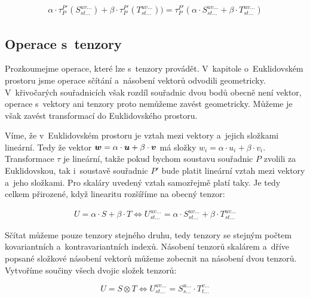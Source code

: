 \begin{equation}
\label{eq:linearni_transformace_tenzoru}
\begin{split}
\alpha \cdot \tau_{P}^{P'}(S_{st...}^{uv...}) + \beta \cdot \tau_{P}^{P'}(T_{st...}^{uv...})) = \tau_{P}^{P'}(\alpha \cdot S_{st...}^{uv...} + \beta \cdot T_{st...}^{uv...})
\end{split}
\end{equation}

\subsection{Operace s~tenzory}

Prozkoumejme operace, které lze s~tenzory provádět. V~kapitole o~Euklidovském prostoru jsme operace sčítání a~násobení vektorů odvodili geometricky. V~křivočarých souřadnicích však rozdíl souřadnic dvou bodů obecně není vektor, operace s~vektory ani tenzory proto nemůžeme zavést geometricky. Můžeme je však zavést transformací do Euklidovského prostoru.

Víme, že v~Euklidovském prostoru je vztah mezi vektory a~jejich složkami lineární. Tedy že vektor \(\boldsymbol{w} = \alpha \cdot \boldsymbol{u} + \beta \cdot \boldsymbol{v}\) má složky \(w_i = \alpha \cdot u_i + \beta \cdot v_i\). Transformace \(\tau\) je lineární, takže pokud bychom soustavu souřadnic \(P\) zvolili za Euklidovskou, tak i~soustavě souřadnic \(P'\) bude platit lineární vztah mezi vektory a~jeho složkami. Pro skaláry uvedený vztah samozřejmě platí taky. Je tedy celkem přirozené, když linearitu rozšíříme na obecný tenzor:

\begin{equation}
\label{eq:scitani_a_nasobeni_tenzoru}
\begin{split}
U = \alpha \cdot S + \beta \cdot T \Leftrightarrow U_{st...}^{uv...} = \alpha \cdot S_{st...}^{uv...} + \beta \cdot T_{st...}^{uv...}
\end{split}
\end{equation}

Sčítat můžeme pouze tenzory stejného druhu, tedy tenzory se stejným počtem kovariantních a~kontravariantních indexů. Násobení tenzorů skalárem a~dříve popsané složkové násobení vektorů můžeme zobecnit na násobení dvou tenzorů. Vytvoříme součiny všech dvojic složek tenzorů:

\begin{equation}
\label{eq:nasobeni_tenzoru}
U = S \otimes T \Leftrightarrow U_{st...}^{uv...} = S_{s...}^{u...} \cdot T_{t...}^{v...}
\end{equation}

